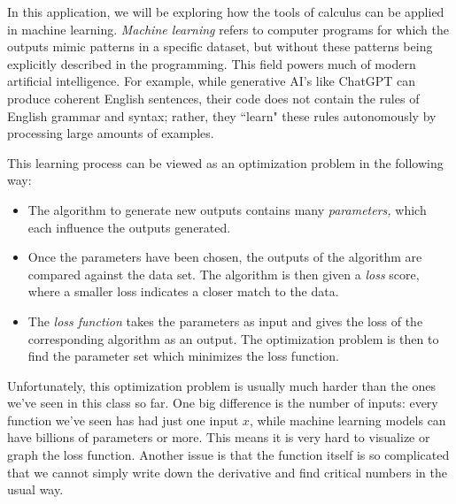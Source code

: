 \documentclass[11pt]{article}
\begin{document}
\begin{minipage}[c]{0.63\textwidth}


\vspace{1em}

In this application, we will be exploring how the tools of calculus can be applied in machine learning. \textit{Machine learning} refers to computer programs for which the outputs mimic patterns in a specific dataset, but without these patterns being explicitly described in the programming. This field powers much of modern artificial intelligence. For example, while generative AI's like ChatGPT can produce coherent English sentences, their code does not contain the rules of English grammar and syntax; rather, they ``learn" these rules autonomously by processing large amounts of examples. 

This learning process can be viewed as an optimization problem in the following way:
\begin{itemize}
    \item The algorithm to generate new outputs contains many \textit{parameters,} which each influence the outputs generated.
    \item Once the parameters have been chosen, the outputs of the algorithm are compared against the data set. The algorithm is then given a \textit{loss} score, where a smaller loss indicates a closer match to the data.
    \item The \textit{loss function} takes the parameters as input and gives the loss of the corresponding algorithm as an output. The optimization problem is then to find the parameter set which minimizes the loss function.
\end{itemize}
\end{minipage}
\newpage



















Unfortunately, this optimization problem is usually much harder than the ones we've seen in this class so far. One big difference is the number of inputs: every function we've seen has had just one input $x$, while machine learning models can have billions of parameters or more. This means it is very hard to visualize or graph the loss function. Another issue is that the function itself is so complicated that we cannot simply write down the derivative and find critical numbers in the usual way.
\end{document}
